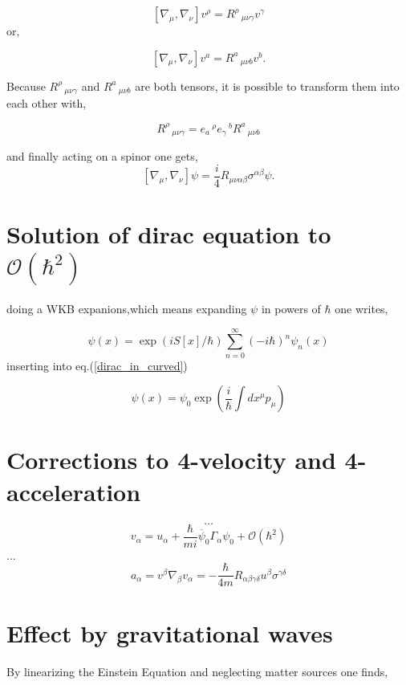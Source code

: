 \documentclass[12pt,a4paper]{article}
\begin{document}
	$$
	[\nabla_\mu, \nabla_\nu]v^\rho =  R^\rho\,_{\mu \nu \gamma } v^\gamma
	$$
	or,
	
	$$
	[\nabla_\mu, \nabla_\nu]v^a =  R^a\,_{\mu \nu b } v^b.
	$$
	
	Because $R^\rho\,_{\mu \nu \gamma }$ and $R^a\,_{\mu \nu b }$ are both tensors, it is possible to transform them into each other with,
	
	$$
	R^\rho\,_{\mu \nu \gamma } = e_a\,^\rho e_\gamma\,^b R^a\,_{\mu \nu b }
	$$
	
	and finally acting on a spinor one gets,
	$$
	[\nabla_\mu, \nabla_\nu]\psi = \frac{i}{4} R_{\mu \nu \alpha \beta} \sigma^{\alpha \beta} \psi.
	$$
	
	
	
	\section{Solution of dirac equation to $\mathcal{O} (\hbar^2)$}
	doing a WKB expanions,which means expanding $\psi$ in powers of $\hbar$ one writes,
	
	\begin{equation}
		\psi(x) = \exp(i S[x]/\hbar) \sum_{n=0}^{\infty}(-i\hbar)^n \psi_n(x)
	\end{equation}
	inserting into eq.(\ref{dirac_in_curved})
	
	
	\begin{equation}
		\label{solution_to_diraceq}
		\psi(x) = \psi_0 \exp\left(\frac{i}{\hbar}\int dx^\mu p_\mu\right)
	\end{equation}
	\section{Corrections to 4-velocity and 4-acceleration}
	$$
	\ldots
	$$
	\begin{equation}
		\label{correction_to_v}
		v_\alpha = u_\alpha + \frac{\hbar}{mi}\overbar{\psi}_0 \Gamma_\alpha \psi_0 +\mathcal{O} (\hbar^2)
	\end{equation}
	$\ldots$
	\begin{equation}
		\label{correction_to_a}
		a_\alpha = v^\beta \nabla_\beta v_\alpha =  -\frac{\hbar}{4m} R_{\alpha \beta \gamma \delta}u^\beta \sigma^{\gamma \delta}
	\end{equation}
	
	
	
	\section{Effect by gravitational waves}
	By linearizing the Einstein Equation and neglecting matter sources one finds,
	
\end{document}
